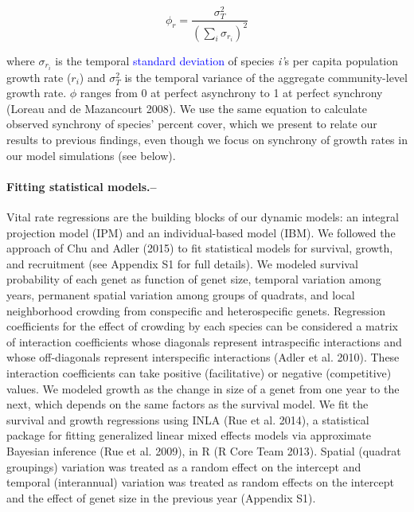 \documentclass[12pt,]{article}
\begin{document}
\begin{equation}
\phi_r = \frac{\sigma^{2}_{T}}{(\sum_{i}\sigma_{r_{i}})^{2}}
\end{equation}

\noindent where \(\sigma_{r_{i}}\) is the temporal
\textcolor{blue}{standard deviation} of species \emph{i'}s per capita
population growth rate (\(r_i\)) and \(\sigma^{2}_{T}\) is the temporal
variance of the aggregate community-level growth rate. \(\phi\) ranges
from 0 at perfect asynchrony to 1 at perfect synchrony (Loreau and {{de
Mazancourt}} 2008). We use the same equation to calculate observed
synchrony of species' percent cover, which we present to relate our
results to previous findings, even though we focus on synchrony of
growth rates in our model simulations (see below).

\paragraph{Fitting statistical
models.--}\label{fitting-statistical-models.}

Vital rate regressions are the building blocks of our dynamic models: an
integral projection model (IPM) and an individual-based model (IBM). We
followed the approach of Chu and Adler (2015) to fit statistical models
for survival, growth, and recruitment (see Appendix S1 for full
details). We modeled survival probability of each genet as function of
genet size, temporal variation among years, permanent spatial variation
among groups of quadrats, and local neighborhood crowding from
conspecific and heterospecific genets. Regression coefficients for the
effect of crowding by each species can be considered a matrix of
interaction coefficients whose diagonals represent intraspecific
interactions and whose off-diagonals represent interspecific
interactions (Adler et al. 2010). These interaction coefficients can
take positive (facilitative) or negative (competitive) values. We
modeled growth as the change in size of a genet from one year to the
next, which depends on the same factors as the survival model. We fit
the survival and growth regressions using INLA (Rue et al. 2014), a
statistical package for fitting generalized linear mixed effects models
via approximate Bayesian inference (Rue et al. 2009), in R (R Core Team
2013). Spatial (quadrat groupings) variation was treated as a random
effect on the intercept and temporal (interannual) variation was treated
as random effects on the intercept and the effect of genet size in the
previous year (Appendix S1).
\end{document}
